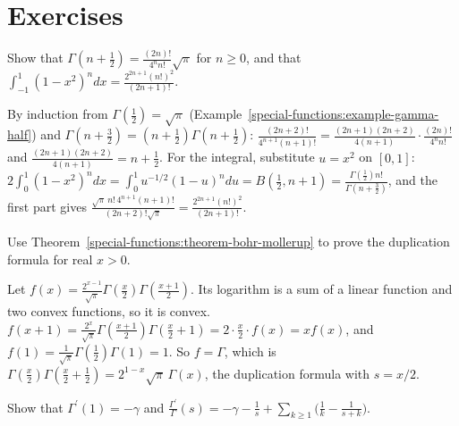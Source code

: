 \section{Exercises}\label{special-functions:section-exercises}

\begin{exercise}\label{special-functions:exercise-gamma-half-integers}
Show that $\Gamma(n + \frac12) = \frac{(2n)!}{4^nn!}\sqrt{\pi}$ for $n \geq 0$, and that $\int_{-1}^1(1 - x^2)^ndx = \frac{2^{2n+1}(n!)^2}{(2n + 1)!}$.
\end{exercise}

\begin{solution}
By induction from $\Gamma(\frac12) = \sqrt\pi$ (Example~\ref{special-functions:example-gamma-half}) and $\Gamma(n + \frac32) = (n + \frac12)\Gamma(n + \frac12)$: $\frac{(2n + 2)!}{4^{n+1}(n + 1)!} = \frac{(2n + 1)(2n + 2)}{4(n + 1)}\cdot\frac{(2n)!}{4^nn!}$ and
$\frac{(2n + 1)(2n + 2)}{4(n + 1)} = n + \frac12$. For the integral, substitute $u = x^2$ on $[0, 1]$: $2\int_0^1(1 - x^2)^ndx = \int_0^1u^{-1/2}(1 - u)^ndu = B(\frac12, n + 1) = \frac{\Gamma(\frac12)n!}{\Gamma(n + \frac32)}$, and the first
part gives $\frac{\sqrt\pi\,n!\,4^{n+1}(n + 1)!}{(2n + 2)!\sqrt\pi} = \frac{2^{2n+1}(n!)^2}{(2n + 1)!}$.
\end{solution}

\begin{exercise}\label{special-functions:exercise-duplication-bohr-mollerup}
Use Theorem~\ref{special-functions:theorem-bohr-mollerup} to prove the duplication formula for real $x > 0$.
\end{exercise}

\begin{solution}
Let $f(x) = \frac{2^{x-1}}{\sqrt\pi}\Gamma(\frac x2)\Gamma(\frac{x + 1}{2})$. Its logarithm is a sum of a linear function and two convex functions, so it is convex. $f(x + 1) = \frac{2^x}{\sqrt\pi}\Gamma(\frac{x+1}2)\Gamma(\frac x2 + 1) = 2\cdot\frac x2\cdot f(x) = xf(x)$,
and $f(1) = \frac{1}{\sqrt\pi}\Gamma(\frac12)\Gamma(1) = 1$. So $f = \Gamma$, which is $\Gamma(\frac x2)\Gamma(\frac x2 + \frac12) = 2^{1-x}\sqrt\pi\,\Gamma(x)$, the duplication formula with $s = x/2$.
\end{solution}

\begin{exercise}\label{special-functions:exercise-digamma}
Show that $\Gamma^{\prime}(1) = -\gamma$ and $\frac{\Gamma^{\prime}}{\Gamma}(s) = -\gamma - \frac1s + \sum_{k \geq 1}\bigl(\frac1k - \frac{1}{s + k}\bigr)$.
\end{exercise}

